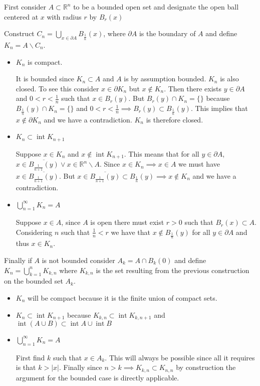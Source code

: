 \documentclass[12pt]{article}
\newcommand{\inter}{\operatorname{int}}
\begin{document}
First consider $A\subset \mathbb{R}^n$ to be a bounded open set and designate the open ball centered at $x$ with radius $r$ by $B_r(x)$

Construct $C_n=\bigcup_{x \in \partial A} B_{\frac{1}{n}}(x)$, where $\partial A$ is the boundary of $A$ and define $K_n = A \backslash C_n$.

\begin{itemize}
\item $K_n$ is compact.

It is bounded since $K_n \subset A$ and $A$ is by assumption bounded.
 $K_n$ is also closed. To see this consider $x \in \partial K_n$ but $x \notin K_n$. Then there exists $y \in \partial A$ and $0<r<\frac{1}{n}$ such that $x \in B_r(y)$.
But $B_r(y) \cap K_n = \{\}$ because $B_{\frac{1}{n}}(y) \cap K_n = \{\}$ and $0<r<\frac{1}{n} \implies B_r(y) \subset B_{\frac{1}{n}}(y)$.
This implies that $x \notin \partial K_n$ and we have a contradiction. $K_n$ is therefore closed.

\item $K_{n} \subset \inter K_{n+1}$

Suppose $x \in K_n$ and $x \notin \inter K_{n+1}$. This means that for all $y \in \partial A$, $x \in \overline{B_{\frac{1}{n+1}}(y)} \vee x \in \mathbb{R}^n \backslash A$.
Since $x \in K_n \implies x \in A$ we must have $x \in \overline{B_{\frac{1}{n+1}}(y)}$.
But $x \in \overline{B_{\frac{1}{n+1}}(y)} \subset B_{\frac{1}{n}}(y) \implies x \notin K_n$ and we have a contradiction.

\item $\bigcup_{n=1}^{\infty} K_n = A$

Suppose $x \in A$, since $A$ is open there must exist $r>0$ such that $B_r(x) \subset A$.
Considering $n$ such that $\frac{1}{n}<r$ we have that $x \notin B_{\frac{1}{n}}(y)$ for all $y \in \partial A$ and thus $x \in K_n$.

\end{itemize}

Finally if $A$ is not bounded consider $A_k = A \cap B_{k}(0)$ and define $K_n = \bigcup_{k=1}^n K_{k,n}$ where $K_{k,n}$ is the set resulting from the previous construction on the bounded set $A_k$.

\begin{itemize}

\item $K_n$  will be compact because it is the finite union of compact sets.

\item $K_{n} \subset \inter K_{n+1}$ because $K_{k,n} \subset \inter K_{k,n+1}$ and $\inter(A \cup B) \subset \inter A \cup \inter B$

\item $\bigcup_{n=1}^{\infty} K_n = A$

First find $k$ such that $x \in A_k$.
This will always be possible since all it requires is that $k>|x|$.
Finally since $n > k \implies K_{k,n} \subset K_{n,n}$ by construction the argument for the bounded case is directly applicable.

\end{itemize}
\end{document}
